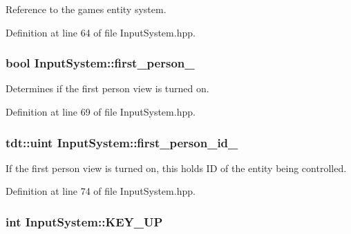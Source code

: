 Reference to the game\textquotesingle{}s entity system. 



Definition at line 64 of file Input\+System.\+hpp.

\subsubsection[{\texorpdfstring{first\+\_\+person\+\_\+}{first_person_}}]{\setlength{\rightskip}{0pt plus 5cm}bool Input\+System\+::first\+\_\+person\+\_\+\hspace{0.3cm}{\ttfamily [private]}}\hypertarget{class_input_system_a3c7bdb083dc27e80b9d20f6f8fcedb79}{}\label{class_input_system_a3c7bdb083dc27e80b9d20f6f8fcedb79}


Determines if the first person view is turned on. 



Definition at line 69 of file Input\+System.\+hpp.

\subsubsection[{\texorpdfstring{first\+\_\+person\+\_\+id\+\_\+}{first_person_id_}}]{\setlength{\rightskip}{0pt plus 5cm}tdt\+::uint Input\+System\+::first\+\_\+person\+\_\+id\+\_\+\hspace{0.3cm}{\ttfamily [private]}}\hypertarget{class_input_system_ab6760a6b3b09cc28e564eac23ea4fd53}{}\label{class_input_system_ab6760a6b3b09cc28e564eac23ea4fd53}


If the first person view is turned on, this holds ID of the entity being controlled. 



Definition at line 74 of file Input\+System.\+hpp.

\subsubsection[{\texorpdfstring{K\+E\+Y\+\_\+\+UP}{KEY_UP}}]{\setlength{\rightskip}{0pt plus 5cm}int Input\+System\+::\+K\+E\+Y\+\_\+\+UP\hspace{0.3cm}{\ttfamily [private]}}\hypertarget{class_input_system_a28f6fccea67986967559e39cf0215c8b}{}\label{class_input_system_a28f6fccea67986967559e39cf0215c8b}



